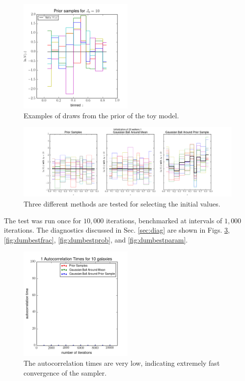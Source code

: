 \documentclass[preprint]{aastex}
\begin{document}
\begin{figure}
\includegraphics[width=0.5\textwidth]{toy/priorsamps.png}
\caption{Examples of draws from the prior of the toy model.}
\label{fig:fakeprior}
\end{figure}

\begin{figure}
\includegraphics[width=\textwidth]{toy/initializations.png}
\caption{Three different methods are tested for selecting the initial values.}
\label{fig:fakeival}
\end{figure}

The test was run once for $10,000$ iterations, benchmarked at intervals of $1,000$ iterations.  The diagnostics discussed in Sec. \ref{sec:diag} are shown in Figs. \ref{fig:dumbestacor}, \ref{fig:dumbestfrac}, \ref{fig:dumbestprob}, and \ref{fig:dumbestparam}.

\begin{figure}
\includegraphics[width=0.5\textwidth]{toy/times.png}
\caption{The autocorrelation times are very low, indicating extremely fast convergence of the sampler.}
\label{fig:dumbestacor}
\end{figure}
\end{document}
